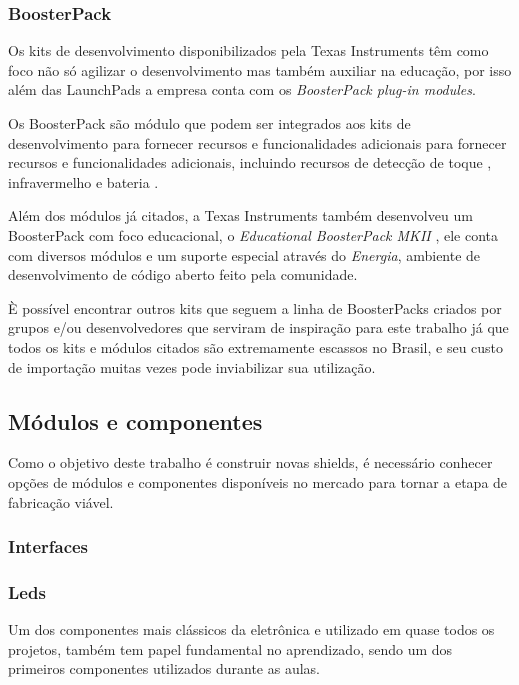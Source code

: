 \subsubsection{BoosterPack}

Os kits de desenvolvimento disponibilizados pela Texas Instruments têm como foco não só agilizar o desenvolvimento mas também auxiliar na educação, por isso além das LaunchPads a empresa conta com os \textit{BoosterPack plug-in modules}.

Os BoosterPack são módulo que podem ser integrados aos kits de desenvolvimento para fornecer recursos e funcionalidades adicionais para fornecer recursos e funcionalidades adicionais, incluindo recursos de detecção de toque \cite{TexasInstruments}, infravermelho \cite{TexasInstrumentsa}  e bateria \cite{TexasInstrumentsb}.

Além dos módulos já citados, a Texas Instruments também desenvolveu um BoosterPack com foco educacional, o \textit{Educational BoosterPack MKII} \cite{TexasInstrumentsc}, ele conta com diversos módulos e um suporte especial através do \textit{Energia}, ambiente de desenvolvimento de código aberto feito pela comunidade.

È possível encontrar outros kits que seguem a linha de BoosterPacks criados por grupos e/ou desenvolvedores \cite{43oh} que serviram de inspiração para este trabalho já que todos os kits e módulos citados são extremamente escassos no Brasil, e seu custo de importação muitas vezes pode inviabilizar sua utilização.

\subsection{Módulos e componentes}

Como o objetivo deste trabalho é construir novas shields,  é necessário conhecer opções de módulos e componentes disponíveis no mercado para tornar a etapa de fabricação viável.

\subsubsection{Interfaces}

\subsubsection*{Leds}

Um dos componentes mais clássicos da eletrônica e utilizado em quase todos os projetos, também tem papel fundamental no aprendizado, sendo um dos primeiros componentes utilizados durante as aulas.

